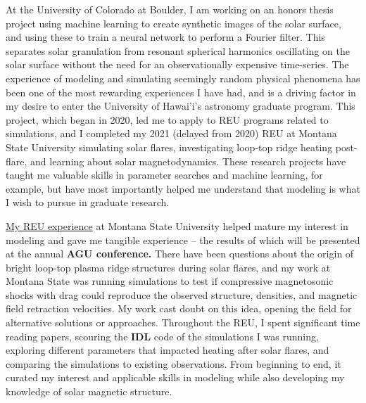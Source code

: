 \documentclass[11pt,letterpaper]{article}
\begin{document}
At the University of Colorado at Boulder, I am working on an honors thesis project using machine learning to create synthetic images of the solar surface, and using these to train a neural network to perform a Fourier filter. This separates solar granulation from resonant spherical harmonics oscillating on the solar surface without the need for an observationally expensive time-series. The experience of modeling and simulating seemingly random physical phenomena has been one of the most rewarding experiences I have had, and is a driving factor in my desire to enter the University of Hawai'i's  astronomy graduate program. This project, which began in 2020, led me to apply to REU programs related to simulations, and I completed my 2021 (delayed from 2020) REU at Montana State University simulating solar flares, investigating loop-top ridge heating post-flare, and learning about solar magnetodynamics. These research projects have taught me valuable skills in parameter searches and machine learning, for example, but have most importantly helped me understand that modeling is what I wish to pursue in graduate research.
 
\href{http://solar.physics.montana.edu/www/reu/2021/mccreery/}{My REU experience} at Montana State University helped mature my interest in modeling and gave me tangible experience – the results of which will be presented at the annual \textbf{AGU conference.} There have been questions about the origin of bright loop-top plasma ridge structures during solar flares, and my work at Montana State was running simulations to test if compressive magnetosonic shocks with drag could reproduce the observed structure, densities, and magnetic field retraction velocities. My work cast doubt on this idea, opening the field for alternative solutions or approaches. Throughout the REU, I spent significant time reading papers, scouring the \textbf{IDL} code of the simulations I was running, exploring different parameters that impacted heating after solar flares, and comparing the simulations to existing observations. From beginning to end, it curated my interest and applicable skills in modeling while also developing my knowledge of solar magnetic structure. 
\end{document}
